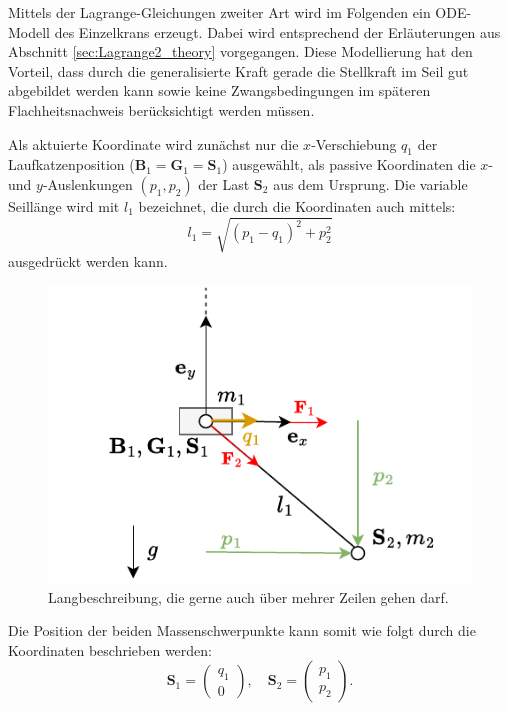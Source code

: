 Mittels der Lagrange-Gleichungen zweiter Art wird im Folgenden ein ODE-Modell des Einzelkrans erzeugt. Dabei wird entsprechend der Erläuterungen aus Abschnitt \ref{sec:Lagrange2_theory} vorgegangen. Diese Modellierung hat den Vorteil, dass durch die generalisierte Kraft gerade die Stellkraft im Seil gut abgebildet werden kann sowie keine Zwangsbedingungen im späteren Flachheitsnachweis berücksichtigt werden müssen.

Als aktuierte Koordinate wird zunächst nur die $x$-Verschiebung $q_1$ der Laufkatzenposition ($\mathbf{B}_1 = \mathbf{G}_1 = \mathbf{S}_1$) ausgewählt, als passive Koordinaten die $x$- und $y$-Auslenkungen $(p_1, p_2)$ der Last $\mathbf{S}_2$ aus dem Ursprung. Die variable Seillänge wird mit $l_1$ bezeichnet, die durch die Koordinaten auch mittels:
\begin{equation}
	l_1 = \sqrt{(p_1 - q_1)^2 + p_2^2}
\end{equation}
ausgedrückt werden kann.

\begin{figure}[ht]
	\begin{center}
		\includegraphics[scale=1]{Pictures/ODE_flatness_analysis_single_crane_diagram}
	\end{center}
	\caption[Kurzbeschreibung für Abbildungsverzeichnis]
	{Langbeschreibung, die gerne auch über mehrer Zeilen gehen darf.}
	\label{fig:single_crane_diagram}
\end{figure}

Die Position der beiden Massenschwerpunkte kann somit wie folgt durch die Koordinaten beschrieben werden:
\begin{equation}
	\mathbf{S}_1 =
	\begin{pmatrix}
		q_1 \\
		0
	\end{pmatrix}, 
	\quad
	\mathbf{S}_2 =
	\begin{pmatrix}
		p_1 \\
		p_2
	\end{pmatrix}.
\end{equation}

